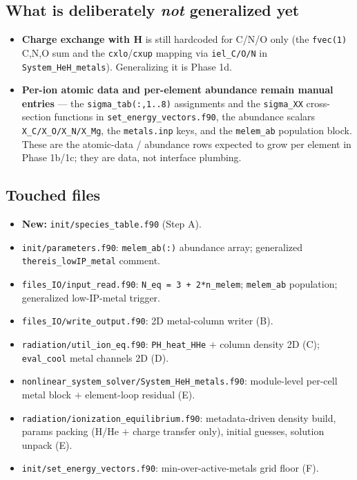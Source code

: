 \documentclass[english,a4paper]{kiseon_memo}
\begin{document}
\subsection{What is deliberately \emph{not} generalized yet}

\begin{itemize}
\item \textbf{Charge exchange with H} is still hardcoded for C/N/O only (the
  \verb|fvec(1)| C,N,O sum and the \verb|cxlo|/\verb|cxup| mapping via
  \verb|iel_C/O/N| in \verb|System_HeH_metals|). Generalizing it is Phase 1d.
\item \textbf{Per-ion atomic data and per-element abundance remain manual
  entries} --- the \verb|sigma_tab(:,1..8)| assignments and the \verb|sigma_XX|
  cross-section functions in \verb|set_energy_vectors.f90|, the abundance scalars
  \verb|X_C/X_O/X_N/X_Mg|, the \texttt{metals.inp} keys, and the \verb|melem_ab|
  population block. These are the atomic-data / abundance rows expected to grow
  per element in Phase 1b/1c; they are data, not interface plumbing.
\end{itemize}

\subsection{Touched files}

{\sloppy
\begin{itemize}
\item \textbf{New:} \texttt{init/species\_table.f90} (Step A).
\item \texttt{init/parameters.f90}: \verb|melem_ab(:)| abundance array;
  generalized \verb|thereis_lowIP_metal| comment.
\item \texttt{files\_IO/input\_read.f90}: \verb|N_eq = 3 + 2*n_melem|;
  \verb|melem_ab| population; generalized low-IP-metal trigger.
\item \texttt{files\_IO/write\_output.f90}: 2D metal-column writer (B).
\item \texttt{radiation/util\_ion\_eq.f90}: \verb|PH_heat_HHe| $+$ column density
  2D (C); \verb|eval_cool| metal channels 2D (D).
\item \texttt{nonlinear\_system\_solver/System\_HeH\_metals.f90}: module-level
  per-cell metal block $+$ element-loop residual (E).
\item \texttt{radiation/ionization\_equilibrium.f90}: metadata-driven density
  build, params packing (H/He $+$ charge transfer only), initial guesses, solution
  unpack (E).
\item \texttt{init/set\_energy\_vectors.f90}: min-over-active-metals grid floor
  (F).
\end{itemize}
}
\end{document}
